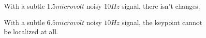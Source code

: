\begin{figure}[h!]
\centering
{}
\caption[Dial Descriptors 1]{With a subtle $1.5 microvolt$ noisy $10 Hz$ signal, there isn't changes.}
\label{fig:dialdescriptors1}
\end{figure}


\begin{figure}[h!]
\centering
{}
\caption[Dial Descriptors 1]{With a subtle $6.5 microvolt$ noisy $10 Hz$ signal, the keypoint cannot be localized at all.}
\label{fig:dialdescriptors1}
\end{figure}

